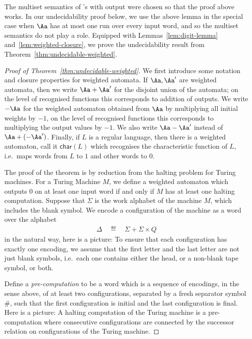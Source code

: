 The multiset semantics of \nfa's with output were chosen so that the proof above works. In our undecidability proof below, we use the above lemma in the special case when $\Aa$ has at most one run over every input word, and so the multiset semantics do not play a role.  Equipped with Lemmas~\ref{lem:digit-lemma} and~\ref{lem:weighted-closure}, we  prove the undecidability result from Theorem~\ref{thm:undecidable-weighted}.
\begin{proof}[Proof of Theorem~\ref{thm:undecidable-weighted}]
We first  introduce some notation and  closure properties for weighted automata.  If $\Aa, \Aa'$ are weighted automata, then we write $\Aa+ \Aa'$ for the disjoint union of the automata; on the level of recognised functions this  corresponds to addition of outputs.  We write $-\Aa$ for the weighted automaton obtained from $\Aa$ by multiplying all initial weights by $-1$, on the level of recognised functions this corresponds to  multiplying the output values by $-1$. We also write $\Aa-\Aa'$ instead of $\Aa+(-\Aa')$.  Finally, if $L$ is a regular language, then there is a weighted automaton, call it $\mathsf{char}(L)$ which recognises the characteristic function of $L$, i.e.~maps words from $L$ to $1$ and other words to $0$. 

The proof of the theorem is by  reduction from the halting problem for Turing machines. For a Turing Machine $M$, we define a weighted automaton  which  outputs $0$ on at least one input word if and only if $M$ has at least one halting computation. Suppose that $\Sigma$ is the work alphabet of the machine $M$, which includes the blank symbol. We  encode a configuration of the machine as a word over  the alphabet
\begin{align*}
  \Delta  \quad \eqdef \quad  \Sigma + \Sigma \times Q
\end{align*}
in the natural way, here is a picture:
To ensure that each configuration has exactly one encoding, we assume that the first letter and the last letter are not just blank symbols, i.e.~each one contains either the head, or a non-blank tape symbol, or both. 

  
Define a \emph{pre-computation} to be a word which is a sequence of encodings, in the sense above, of at least two configurations, separated by a fresh separator symbol $\#$, such that the first configuration is initial and the last configuration is final. Here is a picture:
A halting computation of the  Turing machine is a pre-computation where  consecutive configurations are connected by the successor relation on configurations of the Turing machine.  
  

\end{proof}
